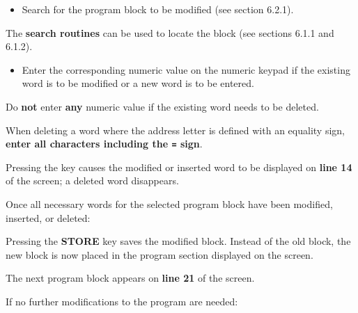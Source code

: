 \begin{itemize}
    \item Search for the program block to be modified (see section 6.2.1).
\end{itemize}

The \textbf{search routines} can be used to locate the block (see sections 6.1.1 and 6.1.2).

\begin{itemize}
\end{itemize}

\begin{itemize}
    \item Enter the corresponding numeric value on the numeric keypad if the existing word is to be modified or a new word is to be entered.
\end{itemize}

Do \textbf{not} enter \textbf{any} numeric value if the existing word needs to be deleted.

When deleting a word where the address letter is defined with an equality sign, \textbf{enter all characters including the \texttt{=} sign}.

\begin{itemize}
\end{itemize}

Pressing the key causes the modified or inserted word to be displayed on \textbf{line 14} of the screen; a deleted word disappears.

Once all necessary words for the selected program block have been modified, inserted, or deleted:

\begin{itemize}
\end{itemize}

Pressing the \textbf{STORE} key saves the modified block.  
Instead of the old block, the new block is now placed in the program section displayed on the screen.

The next program block appears on \textbf{line 21} of the screen.

If no further modifications to the program are needed:

\begin{itemize}
\end{itemize}

